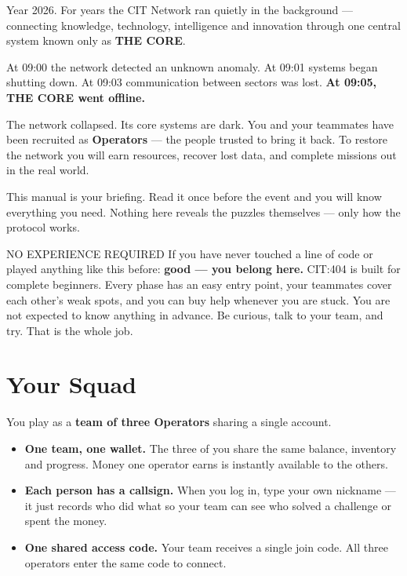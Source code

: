 \documentclass[11pt]{article}
\begin{document}
\vspace{0.5em}
Year 2026. For years the CIT Network ran quietly in the background —
connecting knowledge, technology, intelligence and innovation through one
central system known only as \textbf{THE CORE}.

At 09:00 the network detected an unknown anomaly. At 09:01 systems began
shutting down. At 09:03 communication between sectors was lost.
\textbf{\color{alert}At 09:05, THE CORE went offline.}

The network collapsed. Its core systems are dark. You and your teammates
have been recruited as \textbf{Operators} — the people trusted to bring it
back. To restore the network you will earn resources, recover lost data, and
complete missions out in the real world.

This manual is your briefing. Read it once before the event and you will know
everything you need. Nothing here reveals the puzzles themselves — only how
the protocol works.

\begin{infobox}{NO EXPERIENCE REQUIRED}
If you have never touched a line of code or played anything like this before:
\textbf{good — you belong here.} CIT:404 is built for complete beginners.
Every phase has an easy entry point, your teammates cover each other's weak
spots, and you can buy help whenever you are stuck. You are not expected to
know anything in advance. Be curious, talk to your team, and try. That is the
whole job.
\end{infobox}

\section{Your Squad}
You play as a \textbf{team of three Operators} sharing a single account.

\begin{mypanel}
\begin{itemize}
  \item \textbf{One team, one wallet.} The three of you share the same balance,
        inventory and progress. Money one operator earns is instantly available
        to the others.
  \item \textbf{Each person has a callsign.} When you log in, type your own
        nickname — it just records who did what so your team can see who solved
        a challenge or spent the money.
  \item \textbf{One shared access code.} Your team receives a single join code.
        All three operators enter the same code to connect.
\end{itemize}
\end{mypanel}
\end{document}
